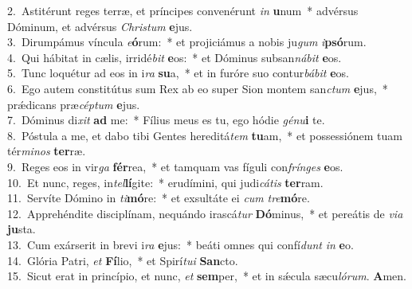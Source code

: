 {2.~}Astitérunt reges terræ, et príncipes convenérunt \textit{in} \textbf{u}num~* advérsus Dóminum, et advérsus \textit{Chri}\textit{stum} \textbf{e}jus.\\
{3.~}Dirumpámus víncula \textit{e}\textbf{ó}rum:~* et projiciámus a nobis ju\textit{gum} \textit{i}\textbf{psó}rum.\\
{4.~}Qui hábitat in cælis, irridé\textit{bit} \textbf{e}os:~* et Dóminus subsan\textit{ná}\textit{bit} \textbf{e}os.\\
{5.~}Tunc loquétur ad eos in i\textit{ra} \textbf{su}a,~* et in furóre suo contur\textit{bá}\textit{bit} \textbf{e}os.\\
{6.~}Ego autem constitútus sum Rex ab eo super Sion montem san\textit{ctum} \textbf{e}jus,~* prǽdicans præ\textit{cép}\textit{tum} \textbf{e}jus.\\
{7.~}Dóminus di\textit{xit} \textbf{ad} me:~* Fílius meus es tu, ego hódie \textit{gé}\textit{nu}\textbf{i} te.\\
{8.~}Póstula a me, et dabo tibi Gentes hereditá\textit{tem} \textbf{tu}am,~* et possessiónem tuam tér\textit{mi}\textit{nos} \textbf{ter}ræ.\\
{9.~}Reges eos in vir\textit{ga} \textbf{fér}rea,~* et tamquam vas fíguli con\textit{frín}\textit{ges} \textbf{e}os.\\
{10.~}Et nunc, reges, in\textit{tel}\textbf{lí}gite:~* erudímini, qui judi\textit{cá}\textit{tis} \textbf{ter}ram.\\
{11.~}Servíte Dómino in \textit{ti}\textbf{mó}re:~* et exsultáte ei \textit{cum} \textit{tre}\textbf{mó}re.\\
{12.~}Apprehéndite disciplínam, nequándo irascá\textit{tur} \textbf{Dó}minus,~* et pereátis de \textit{vi}\textit{a} \textbf{ju}sta.\\
{13.~}Cum exárserit in brevi i\textit{ra} \textbf{e}jus:~* beáti omnes qui confí\textit{dunt} \textit{in} \textbf{e}o.\\
{14.~}Glória Patri, \textit{et} \textbf{Fí}lio,~* et Spirí\textit{tu}\textit{i} \textbf{San}cto.\\
{15.~}Sicut erat in princípio, et nunc, \textit{et} \textbf{sem}per,~* et in sǽcula sæcu\textit{ló}\textit{rum}. \textbf{A}men.\\
